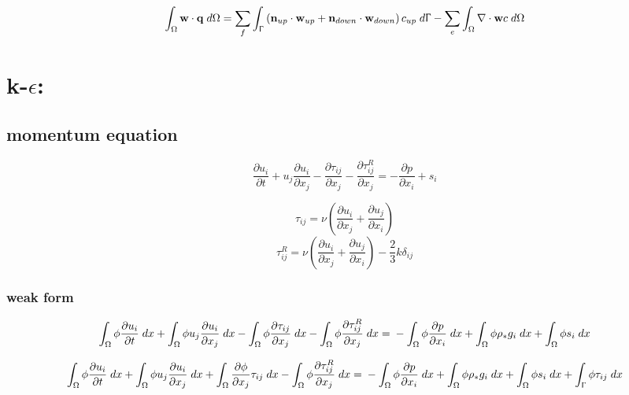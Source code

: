 \documentclass[11pt,a4paper]{article}
\begin{document}
\begin{dmath}
   \int_{\Omega} {\bf w} \cdot {\bf q}  \; d{\Omega} = \sum_f \int_{\Upgamma} \left( {\bf n}_{up} \cdot {\bf w}_{up} + {\bf n}_{down} \cdot {\bf w}_{down} \right)  c_{up} \; d{\Upgamma} - \sum_e \int_{\Omega} \nabla \cdot {\bf w} c  \; d{\Omega}
\end{dmath}

\section{k-$\epsilon$:}

\subsection{momentum equation}

\begin{dmath}
  \frac{\partial u_i}{\partial t} + u_j \frac{\partial u_i}{\partial x_j} - \frac{\partial \tau_{ij}}{\partial x_j} - \frac{\partial \tau_{ij}^R}{\partial x_j} = - \frac{\partial p}{\partial x_i} + s_i
\end{dmath}

\begin{dmath}
  \tau_{ij} = \nu \left( \frac{\partial u_i}{\partial x_j} + \frac{\partial u_j}{\partial x_i} \right)
\end{dmath}
\begin{dmath}
  \tau_{ij}^R = \nu \left( \frac{\partial u_i}{\partial x_j} + \frac{\partial u_j}{\partial x_i} \right) - \frac{2}{3} k \delta_{ij}
\end{dmath}

\subsubsection{weak form}

\begin{dmath}
  \int_\Omega \phi \frac{\partial u_i}{\partial t} \; dx + \int_\Omega \phi u_j \frac{\partial u_i}{\partial x_j} \; dx - \int_\Omega \phi \frac{\partial \tau_{ij}}{\partial x_j} \; dx - \int_\Omega \phi \frac{\partial \tau_{ij}^R}{\partial x_j} \; dx = \\ - \int_\Omega \phi \frac{\partial p}{\partial x_i} \; dx + \int_\Omega \phi \rho_* g_i \; dx + \int_\Omega \phi s_i \; dx
\end{dmath}

\begin{dmath}
  \int_\Omega \phi \frac{\partial u_i}{\partial t} \; dx + \int_\Omega \phi u_j \frac{\partial u_i}{\partial x_j} \; dx + \int_\Omega \frac{\partial \phi}{\partial x_j} \tau_{ij} \; dx - \int_\Omega \phi \frac{\partial \tau_{ij}^R}{\partial x_j} \; dx = \\ - \int_\Omega \phi \frac{\partial p}{\partial x_i} \; dx + \int_\Omega \phi \rho_* g_i \; dx + \int_\Omega \phi s_i \; dx + \int_\Upgamma \phi \tau_{ij} \; dx
\end{dmath}
\end{document}
